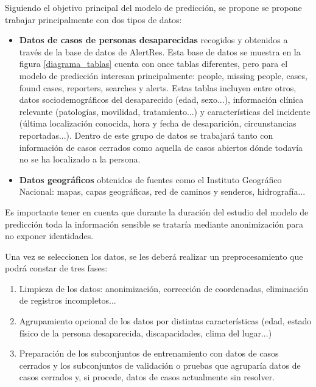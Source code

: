 Siguiendo el objetivo principal del modelo de predicción, se propone se propone trabajar principalmente con dos tipos de datos:
\begin{itemize}
    \item \textbf{Datos de casos de personas desaparecidas} recogidos y obtenidos a través de la base de datos de AlertRes. Esta base de datos se muestra en la figura \ref{diagrama_tablas} cuenta con once tablas diferentes, pero para el modelo de predicción interesan principalmente: people, missing people, cases, found cases, reporters, searches y alerts. Estas tablas incluyen entre otros, datos sociodemográficos del desaparecido (edad, sexo...), información clínica relevante (patologías, movilidad, tratamiento...) y características del incidente (última localización conocida, hora y fecha de desaparición, circunstancias reportadas...). Dentro de este grupo de datos se trabajará tanto con información de casos cerrados como aquella de casos abiertos dónde todavía no se ha localizado a la persona.
    \item \textbf{Datos geográficos} obtenidos de fuentes como el Instituto Geográfico Nacional\cite{IGNPortal}: mapas, capas geográficas, red de caminos y senderos, hidrografía...
\end{itemize}


\vspace{3cm}

\clearpage

Es importante tener en cuenta que durante la duración del estudio del modelo de predicción toda la información sensible se trataría mediante anonimización para no exponer identidades.

Una vez se seleccionen los datos, se les deberá realizar un preprocesamiento que podrá constar de tres fases:
\begin{enumerate}
    \item Limpieza de los datos: anonimización, corrección de coordenadas, eliminación de registros incompletos...
    \item Agrupamiento opcional de los datos por distintas características (edad, estado físico de la persona desaparecida, discapacidades, clima del lugar...)
    \item Preparación de los subconjuntos de entrenamiento con datos de casos cerrados y los subconjuntos de validación o pruebas que agruparía datos de casos cerrados y, si procede, datos de casos actualmente sin resolver.
\end{enumerate}


